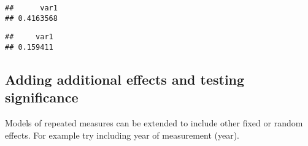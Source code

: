 \documentclass[12pt,]{book}
\newenvironment{Shaded}{\begin{snugshade}}{\end{snugshade}}
\newcommand{\FloatTok}[1]{\textcolor[rgb]{0.00,0.00,0.81}{#1}}
\newcommand{\KeywordTok}[1]{\textcolor[rgb]{0.13,0.29,0.53}{\textbf{#1}}}
\newcommand{\NormalTok}[1]{#1}
\newcommand{\OperatorTok}[1]{\textcolor[rgb]{0.81,0.36,0.00}{\textbf{#1}}}
\newcommand{\StringTok}[1]{\textcolor[rgb]{0.31,0.60,0.02}{#1}}
\begin{document}
\begin{Shaded}
\end{Shaded}

\begin{verbatim}
##      var1 
## 0.4163568
\end{verbatim}

\begin{Shaded}
\end{Shaded}

\begin{verbatim}
##     var1 
## 0.159411
\end{verbatim}

\hypertarget{adding-additional-effects-and-testing-significance-1}{%
\subsection{Adding additional effects and testing significance}\label{adding-additional-effects-and-testing-significance-1}}

Models of repeated measures can be extended to include other fixed or random effects.
For example try including year of measurement (year).
\end{document}

